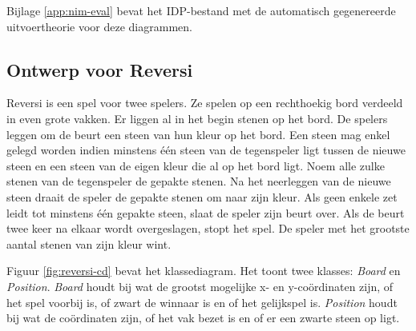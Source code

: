 Bijlage \ref{app:nim-eval} bevat het IDP-bestand met de automatisch gegenereerde uitvoertheorie voor deze diagrammen.


\subsection{Ontwerp voor Reversi}

Reversi is een spel voor twee spelers. Ze spelen op een rechthoekig bord verdeeld in even grote vakken. Er liggen al in het begin stenen op het bord. De spelers leggen om de beurt een steen van hun kleur op het bord. Een steen mag enkel gelegd worden indien minstens \'e\'en steen van de tegenspeler ligt tussen de nieuwe steen en een steen van de eigen kleur die al op het bord ligt. Noem alle zulke stenen van de tegenspeler de gepakte stenen. Na het neerleggen van de nieuwe steen draait de speler de gepakte stenen om naar zijn kleur. Als geen enkele zet leidt tot minstens \'e\'en gepakte steen, slaat de speler zijn beurt over. Als de beurt twee keer na elkaar wordt overgeslagen, stopt het spel. De speler met het grootste aantal stenen van zijn kleur wint.

Figuur \ref{fig:reversi-cd} bevat het klassediagram. Het toont twee klasses: \textit{Board} en \textit{Position}. \textit{Board} houdt bij wat de grootst mogelijke x- en y-co\"ordinaten zijn, of het spel voorbij is, of zwart de winnaar is en of het gelijkspel is. \textit{Position} houdt bij wat de co\"ordinaten zijn, of het vak bezet is en of er een zwarte steen op ligt.

